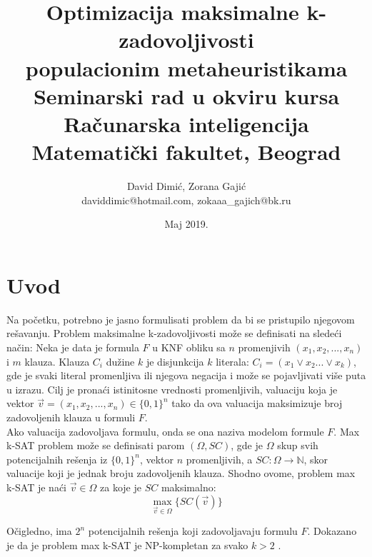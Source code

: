 \documentclass[a4paper]{article}
\title{Optimizacija maksimalne k-zadovoljivosti\\ populacionim metaheuristikama\\ \small{Seminarski rad u okviru kursa\\ Računarska inteligencija\\ Matematički fakultet, Beograd}}
\author{David Dimić, Zorana Gajić \\ daviddimic@hotmail.com, zokaaa\_gajich@bk.ru}
\date{Maj 2019.}
\begin{document}
\maketitle



\setcounter{tocdepth}{2} 
\tableofcontents

\newpage


\section{Uvod}
\label{sec:uvod}
Na početku, potrebno je jasno formulisati problem da bi se pristupilo njegovom rešavanju.
Problem maksimalne k-zadovoljivosti može se definisati na sledeći način: 
Neka je data je formula $F$ u KNF obliku sa $n$ 
promenjivih $(x_1, x_2, ..., x_n)$ i $m$ klauza.
Klauza $C_i$ dužine $k$ je disjunkcija $k$ literala: 
$C_i = (x_1  \vee x_2 ... \vee x_k)$, gde je svaki literal promenljiva ili 
njegova negacija i može se pojavljivati više puta u izrazu.
Cilj je pronaći istinitosne vrednosti promenljivih, valuaciju koja je 
vektor $\vec{v} = (x_1, x_2, ..., x_n) \in \{ 0,1 \}^n$ tako da ova valuacija 
maksimizuje broj zadovoljenih klauza u formuli $F$.\\

Ako valuacija zadovoljava formulu, onda se ona naziva modelom formule $F$. 
Max k-SAT problem može se definisati parom $(\Omega, SC)$, gde je $\Omega$ skup svih
potencijalnih rešenja iz $\{0,1\}^n$, vektor $n$ promenljivih, 
a $SC:\Omega \rightarrow \mathbb{N}$, skor valuacije koji je jednak broju zadovoljenih klauza. 
Shodno ovome, problem max k-SAT je naći $\vec{v} \in \Omega$ za koje je $SC$ maksimalno:
$$\max_{\vec{v} \in \Omega}\{SC(\vec{v})\}$$

Očigledno, ima $2^n$ potencijalnih rešenja koji zadovoljavaju formulu $F$. 
Dokazano je da je problem max k-SAT je NP-kompletan za svako $k>2$ \cite{NP-complete}.\\
\end{document}
